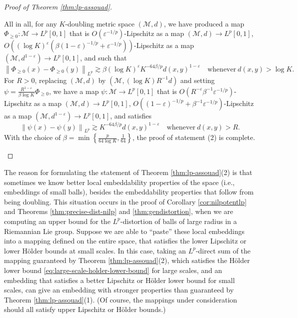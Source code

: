 \documentclass[11pt,reqno]{amsart}
\newcommand{\1}{\mathbf 1}
\begin{document}
\begin{proof}[Proof of Theorem \ref{thm:lp-assouad}]
\begin{enumerate}
All in all, for any $K$-doubling metric space $(\mathcal{M},d)$, we have produced a map $\Phi_{\ge 0}:\mathcal{M}\to L^p[0,1]$ that is $O\left(\varepsilon^{-1/p}\right)$-Lipschitz as a map $(\mathcal{M},d)\to L^p[0,1]$, $O\left(\left(\log K\right)^{\varepsilon} \left(\beta\left(1-\varepsilon\right)^{-1/p}+\varepsilon^{-1/p}\right) \right)$-Lipschitz as a map $(\mathcal{M},d^{1-\varepsilon})\to L^p[0,1]$, and such that
\[
\left\|\Phi_{\ge 0}\left(x\right)-\Phi_{\ge 0}\left(y\right)\right\|_{L^p}\gtrsim \beta\left(\log K\right)^{\varepsilon}K^{-64\beta/p}d\left(x,y\right)^{1-\varepsilon} \quad \mathrm{whenever}~d\left(x,y\right)> \log K.
\]
For $R>0$, replacing $(\mathcal{M},d)$ by $(\mathcal{M},\left(\log K\right)R^{-1}d)$ and setting $\psi=\frac{R^{1-\varepsilon}}{\beta \log K}\Phi_{\ge 0}$, we have a map $\psi:\mathcal{M}\to L^p[0,1]$ that is $O\left(R^{-\varepsilon}\beta^{-1}\varepsilon^{-1/p}\right)$-Lipschitz as a map $(\mathcal{M},d)\to L^p[0,1]$, $O\left(\left(1-\varepsilon\right)^{-1/p}+\beta^{-1}\varepsilon^{-1/p}\right)$-Lipschitz as a map $(\mathcal{M},d^{1-\varepsilon})\to L^p[0,1]$, and satisfies
\[
\left\|\psi\left(x\right)-\psi\left(y\right)\right\|_{L^p}\gtrsim K^{-64\beta/p}d\left(x,y\right)^{1-\varepsilon} \quad \mathrm{whenever}~d\left(x,y\right)>R.
\]
With the choice of $\beta=\min\left\{\frac{p}{64\log K},\frac{1}{64}\right\}$, the proof of statement (2) is complete.
\end{enumerate}
\end{proof}

The reason for formulating the statement of Theorem \ref{thm:lp-assouad}(2) is that sometimes we know better local embeddability properties of the space (i.e., embeddings of small balls), besides the embeddability properties that follow from being doubling. This situation occurs in the proof of Corollary \ref{cor:nilpotentlp} and Theorems \ref{thm:precise-dist-nilp} and \ref{thm:gendistortion}, when we are computing an upper bound for the $L^p$-distortion of balls of large radius in a Riemannian Lie group. Suppose we are able to ``paste'' these local embeddings into a mapping defined on the entire space, that satisfies the lower Lipschitz or lower H\"older bounds at small scales. In this case, taking an $L^p$-direct sum of the mapping guaranteed by Theorem \ref{thm:lp-assouad}(2), which satisfies the H\"older lower bound \eqref{eq:large-scale-holder-lower-bound} for large scales, and an embedding that satisfies a better Lipschitz or H\"older lower bound for small scales, can give an embedding with stronger properties than guaranteed by Theorem \ref{thm:lp-assouad}(1). (Of course, the mappings under consideration should all satisfy upper Lipschitz or H\"older bounds.)
\end{document}
